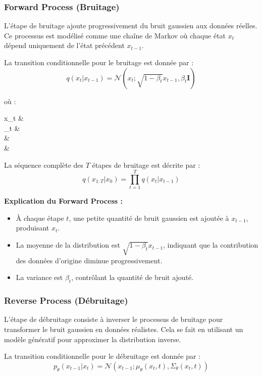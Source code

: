 \subsubsection{Forward Process (Bruitage)}

L'étape de bruitage ajoute progressivement du bruit gaussien aux données
réelles. Ce processus est modélisé comme une chaîne de Markov où chaque état \(
x_t \) dépend uniquement de l'état précédent \( x_{t-1} \).

La transition conditionnelle pour le bruitage est donnée par :
\[
	q(x_t | x_{t-1}) = \mathcal{N}(x_t; \sqrt{1 - \beta_t} x_{t-1}, \beta_t \mathbf{I})
\]

où :
\begin{conditions}
	x_t &  \\
	\beta_t &  \\
	 &  \\
	 & 
\end{conditions}

La séquence complète des \( T \) étapes de bruitage est décrite par :
\[
	q(x_{1:T} | x_0) = \prod_{t=1}^T q(x_t | x_{t-1})
\]

\textbf{Explication du Forward Process :}

\begin{itemize}
	\item À chaque étape \( t \), une petite quantité de bruit gaussien est ajoutée à \( x_{t-1} \), produisant \( x_t \).
	\item La moyenne de la distribution est \( \sqrt{1 - \beta_t} x_{t-1} \), indiquant
	      que la contribution des données d'origine diminue progressivement.
	\item La variance est \( \beta_t \), contrôlant la quantité de bruit ajouté.
\end{itemize}

\subsubsection{Reverse Process (Débruitage)}

L'étape de débruitage consiste à inverser le processus de bruitage pour
transformer le bruit gaussien en données réalistes. Cela se fait en utilisant
un modèle génératif pour approximer la distribution inverse.

La transition conditionnelle pour le débruitage est donnée par :
\[
	p_\theta(x_{t-1} | x_t) = \mathcal{N}(x_{t-1}; \mu_\theta(x_t, t), \Sigma_\theta(x_t, t))
\]

